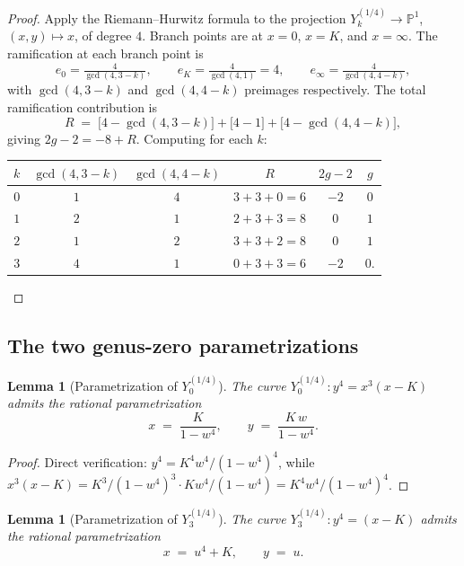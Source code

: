\documentclass[11pt,a4paper]{article}
\theoremstyle{plain}
\newtheorem{lemma}[theorem]{Lemma}
\theoremstyle{definition}
\theoremstyle{remark}
\begin{document}
\begin{proof}
Apply the Riemann--Hurwitz formula to the projection $Y_k^{(1/4)} \to \mathbb{P}^1$, $(x, y) \mapsto x$, of degree $4$. Branch points are at $x = 0$, $x = K$, and $x = \infty$. The ramification at each branch point is
\[
  e_{0} = \tfrac{4}{\gcd(4, 3-k)}, \qquad e_{K} = \tfrac{4}{\gcd(4, 1)} = 4, \qquad e_{\infty} = \tfrac{4}{\gcd(4, 4-k)},
\]
with $\gcd(4, 3-k)$ and $\gcd(4, 4-k)$ preimages respectively. The total ramification contribution is
\[
  R \;=\; \bigl[4 - \gcd(4, 3-k)\bigr] + \bigl[4 - 1\bigr] + \bigl[4 - \gcd(4, 4-k)\bigr],
\]
giving $2g - 2 = -8 + R$. Computing for each $k$:
\begin{center}
\begin{tabular}{c|ccc|cc}
$k$ & $\gcd(4, 3-k)$ & $\gcd(4, 4-k)$ & $R$ & $2g-2$ & $g$ \\
\hline
$0$ & $1$ & $4$ & $3 + 3 + 0 = 6$ & $-2$ & $0$ \\
$1$ & $2$ & $1$ & $2 + 3 + 3 = 8$ & $0$ & $1$ \\
$2$ & $1$ & $2$ & $3 + 3 + 2 = 8$ & $0$ & $1$ \\
$3$ & $4$ & $1$ & $0 + 3 + 3 = 6$ & $-2$ & $0$. \qedhere
\end{tabular}
\end{center}
\end{proof}

\subsection*{The two genus-zero parametrizations}

\begin{lemma}[Parametrization of $Y_0^{(1/4)}$]\label{lem:Y0-param}
The curve $Y_0^{(1/4)}\colon y^4 = x^3(x-K)$ admits the rational parametrization
\[
  x \;=\; \frac{K}{1 - w^4}, \qquad y \;=\; \frac{K\,w}{1 - w^4}.
\]
\end{lemma}

\begin{proof}
Direct verification: $y^4 = K^4 w^4/(1-w^4)^4$, while $x^3(x-K) = K^3/(1-w^4)^3 \cdot K w^4/(1-w^4) = K^4 w^4/(1-w^4)^4$.
\end{proof}

\begin{lemma}[Parametrization of $Y_3^{(1/4)}$]\label{lem:Y3-param}
The curve $Y_3^{(1/4)}\colon y^4 = (x-K)$ admits the rational parametrization
\[
  x \;=\; u^4 + K, \qquad y \;=\; u.
\]
\end{lemma}
\end{document}

